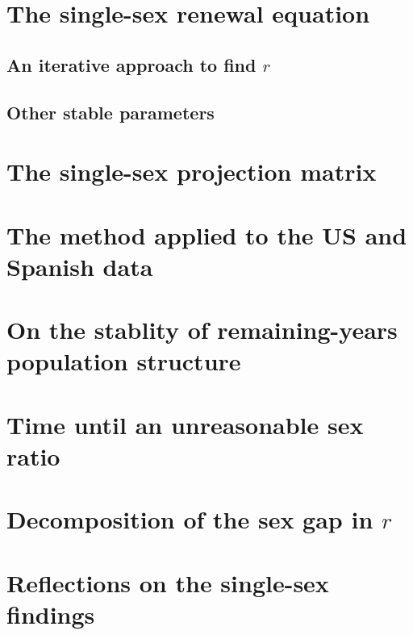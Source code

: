     \section{The single-sex renewal equation}
      
      \subsection{An iterative approach to find $r$}
        
        
      \subsection{Other stable parameters}
        
      
    \section{The single-sex projection matrix}
      
    \section{The method applied to the US and Spanish data}
      
    \section{On the stablity of remaining-years population structure}
      
    \section{Time until an unreasonable sex ratio}
      
    \section{Decomposition of the sex gap in $r$}
      
      
    \section{Reflections on the single-sex findings}
      
